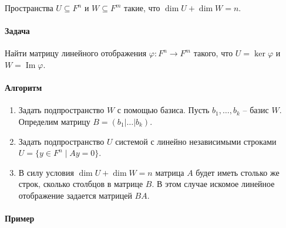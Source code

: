 \documentclass{article}
\renewcommand{\Im}{\operatorname{Im}}
\begin{document}
Пространства $U\subseteq F^n$ и $W \subseteq F^m$ такие, что $\dim U + \dim W = n$.

\paragraph{Задача}

Найти матрицу линейного отображения $\varphi \colon F^n \to F^m$ такого, что $U = \ker \varphi$ и $W = \Im \varphi$.

\paragraph{Алгоритм}

\begin{enumerate}
\item Задать подпространство $W$ с помощью базиса.
Пусть $b_1,\ldots,b_k$ -- базис $W$.
Определим матрицу $B = (b_1 |\ldots |b_k)$.

\item Задать подпространство $U$ системой с линейно независимыми строками $U = \{y\in F^n \mid A y = 0\}$.

\item В силу условия $\dim U + \dim W = n$ матрица $A$ будет иметь столько же строк, сколько столбцов в матрице $B$.
В этом случае искомое линейное отображение задается матрицей $BA$.
\end{enumerate}

\paragraph{Пример}
\end{document}
